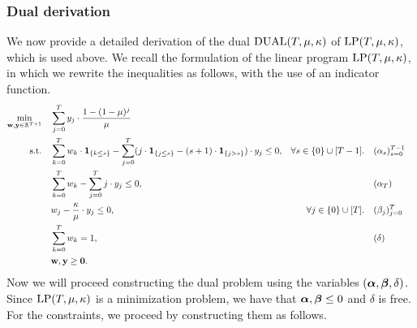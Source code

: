 \subsubsection*{Dual derivation}
We now provide a detailed derivation of the dual $\mathrm{DUAL}(T, \mu, \kappa)$ of $\mathrm{LP}(T,\mu, \kappa)$, which is used above. We recall the formulation of the linear program $\mathrm{LP}(T,\mu, \kappa)$, in which we rewrite the inequalities as follows, with the use of an indicator function.
\begin{equation*}
\begin{aligned}
 \min_{\mathbf{w}, \mathbf{y} \in \mathbb{R}^{T+1}} \quad &  \sum_{j=0}^T y_j  \cdot \frac{1-(1-\mu)^{j}}{\mu}\\
\text{s.t.} \quad & \sum_{k=0}^T w_k \cdot \bm{1}_{\{ k \leq s\}} - \sum_{j=0}^T (j \cdot \bm{1}_{\{ j \leq s\}} - (s+1) \cdot \bm{1}_{\{j > s\}}) \cdot y_j \leq 0, & \forall s \in \{0\} \cup [T-1]. \quad & (\alpha_s)_{s=0}^{T-1}\\
\quad & \sum_{k=0}^T w_k - \sum_{j=0}^T j \cdot y_j  \leq 0, & & (\alpha_T)\\
\quad & w_j - \frac{\kappa}{\mu} \cdot y_j \leq 0, & \forall j \in \{ 0 \} \cup [T]. \quad & (\beta_j)_{j=0}^{T}\\
\quad & \sum_{k=0}^T w_k = 1, & & (\delta)\\
\quad & \mathbf{w}, \mathbf{y} \geq \mathbf{0}.
\end{aligned}
\end{equation*}
Now we will proceed constructing the dual problem using the variables $(\bm{\alpha}, \bm{\beta}, \delta)$. Since $\mathrm{LP}(T,\mu, \kappa)$ is a minimization problem, we have that $\bm{\alpha}, \bm{\beta} \leq 0$ and $\delta$ is free. For the constraints, we proceed by constructing them as follows.
